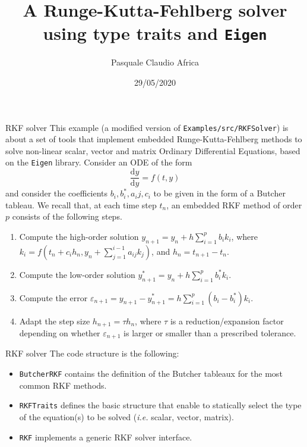 \documentclass[10pt]{beamer}
\begin{document}
    \title{A Runge-Kutta-Fehlberg solver\protect\\ using type traits and \texttt{Eigen}}
    \author{Pasquale Claudio Africa}
    \date{29/05/2020}

\begin{frame}
    \maketitle
\end{frame}

\begin{frame}{RKF solver}
This example (a modified version of \texttt{Examples/src/RKFSolver}) is about a set of tools that implement embedded Runge-Kutta-Fehlberg methods to solve non-linear scalar, vector and matrix Ordinary Differential Equations, based on the \texttt{Eigen} library.
\vfill
Consider an ODE of the form
\begin{equation*}
\frac{\mathrm{d} y}{\mathrm{d} y} = f(t, y)
\end{equation*}
and consider the coefficients \(b_i, b_i^*, a_ij, c_i\) to be given in the form of a Butcher tableau.
We recall that, at each time step \(t_n\), an embedded RKF method of order \(p\) consists of the following steps.
\begin{enumerate}
\item Compute the high-order solution \(y_{n+1} = y_{n} + h \sum_{i=1}^p b_i k_i\), where \(k_i = f\left(t_n + c_i h_n, y_n + \sum_{j=1}^{i-1}a_{ij}k_j\right)\), and \(h_n = t_{n+1} - t_n\).
\item Compute the low-order solution \(y_{n+1}^* = y_{n} + h \sum_{i=1}^p b_i^* k_i\).
\item Compute the error \(\varepsilon_{n+1} = y_{n+1} - y_{n+1}^* = h\sum_{i=1}^p(b_i - b_i^*)k_i\).
\item Adapt the step size \(h_{n+1} = \tau h_{n}\), where \(\tau\) is a reduction/expansion factor depending on whether \(\varepsilon_{n+1}\) is larger or smaller than a prescribed tolerance.
\end{enumerate}
\end{frame}

\begin{frame}{RKF solver}
The code structure is the following:
\begin{itemize}
\item \texttt{ButcherRKF} contains the definition of the Butcher tableaux for the most common RKF methods.
\item \texttt{RKFTraits} defines the basic structure that enable to statically select the type of the equation(s) to be solved (\textit{i.e.} scalar, vector, matrix).
\item \texttt{RKF} implements a generic RKF solver interface.
\end{itemize}
\end{frame}
\end{document}
